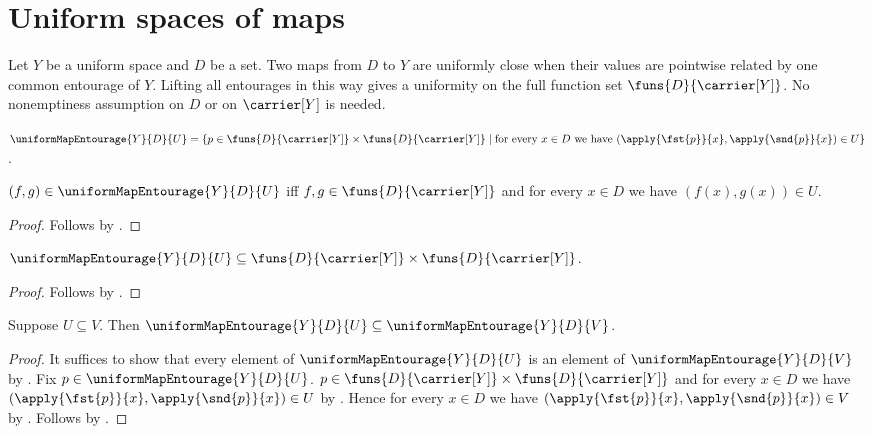 


\section{Uniform spaces of maps}

Let $Y$ be a uniform space and $D$ be a set.  Two maps from $D$ to $Y$
are uniformly close when their values are pointwise related by one common
entourage of $Y$.  Lifting all entourages in this way gives a uniformity on
the full function set $\funs{D}{\carrier[Y]}$.  No nonemptiness assumption on
$D$ or on $\carrier[Y]$ is needed.

\begin{definition}\label{uniform_map_entourage}
    $\uniformMapEntourage{Y}{D}{U}=
        \{p\in
            \funs{D}{\carrier[Y]}\times\funs{D}{\carrier[Y]}\mid
            \text{for every $x\in D$ we have
                $(\apply{\fst{p}}{x},\apply{\snd{p}}{x})\in U$}\}$.
\end{definition}

\begin{proposition}\label{uniform_map_entourage_iff}
    $(f,g)\in\uniformMapEntourage{Y}{D}{U}$ iff
        $f,g\in\funs{D}{\carrier[Y]}$ and for every $x\in D$ we have
            $(f(x),g(x))\in U$.
\end{proposition}
\begin{proof}
    Follows by
        .
\end{proof}

\begin{proposition}\label{uniform_map_entourage_type}
    $\uniformMapEntourage{Y}{D}{U}\subseteq
        \funs{D}{\carrier[Y]}\times\funs{D}{\carrier[Y]}$.
\end{proposition}
\begin{proof}
    Follows by .
\end{proof}

\begin{proposition}\label{uniform_map_entourage_monotone}
    Suppose $U\subseteq V$.
    Then $\uniformMapEntourage{Y}{D}{U}\subseteq
        \uniformMapEntourage{Y}{D}{V}$.
\end{proposition}
\begin{proof}
    It suffices to show that every element of
        $\uniformMapEntourage{Y}{D}{U}$ is an element of
        $\uniformMapEntourage{Y}{D}{V}$ by .
    Fix $p\in\uniformMapEntourage{Y}{D}{U}$.
    $p\in\funs{D}{\carrier[Y]}\times\funs{D}{\carrier[Y]}$ and for every
        $x\in D$ we have
        $(\apply{\fst{p}}{x},\apply{\snd{p}}{x})\in U$ by
        .
    Hence for every $x\in D$ we have
        $(\apply{\fst{p}}{x},\apply{\snd{p}}{x})\in V$ by .
    Follows by .
\end{proof}

